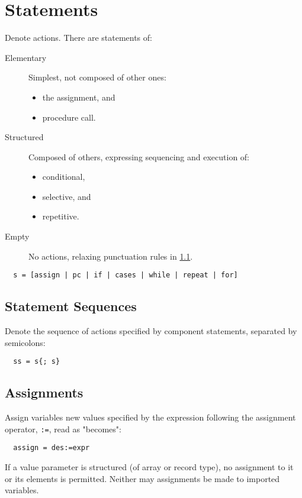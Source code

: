 \section{Statements}
Denote actions. There are statements of:
\begin{description}
  \item[Elementary] Simplest, not composed of other ones:
  \begin{itemize}
    \item the assignment, and 
    \item procedure call.
  \end{itemize}
  \item[Structured] Composed of others, expressing sequencing and execution of:
  \begin{itemize}
    \item conditional,
    \item selective, and
    \item repetitive.
  \end{itemize}
  \item[Empty] No actions, relaxing punctuation rules in \ref{sub:ss}.
\end{description}
\begin{verbatim}
  s = [assign | pc | if | cases | while | repeat | for]
\end{verbatim}

\subsection{Statement Sequences}
\label{sub:ss}
Denote the sequence of actions specified by component statements, separated by semicolons:
\begin{verbatim}
  ss = s{; s}
\end{verbatim}

\subsection{Assignments}
Assign variables new values specified by the expression following the assignment operator,
\verb|:=|, read as "becomes":
\begin{verbatim}
  assign = des:=expr
\end{verbatim}

If a value parameter is structured (of array or record type), no assignment to it or its
elements is permitted. Neither may assignments be made to imported variables.


